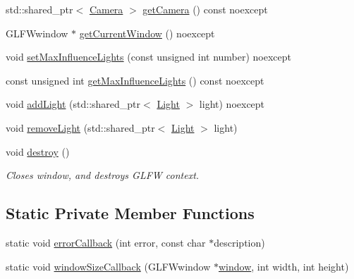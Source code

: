 \begin{DoxyCompactItemize}
\item 
std\+::shared\+\_\+ptr$<$ \hyperlink{class_graphics_1_1_camera}{Camera} $>$ \hyperlink{class_graphics_1_1_graphics_system_a38c09a55355c54a8d72c0107434fb78d}{get\+Camera} () const noexcept
\item 
G\+L\+F\+Wwindow $\ast$ \hyperlink{class_graphics_1_1_graphics_system_a0692ae8d8615f820ed36615e9619fe68}{get\+Current\+Window} () noexcept
\item 
void \hyperlink{class_graphics_1_1_graphics_system_a0ce4ee8411cfd40964b7953937e03818}{set\+Max\+Influence\+Lights} (const unsigned int number) noexcept
\item 
const unsigned int \hyperlink{class_graphics_1_1_graphics_system_a7768af0bfa78b4eafbe6a4126e26e819}{get\+Max\+Influence\+Lights} () const noexcept
\item 
void \hyperlink{class_graphics_1_1_graphics_system_ab9f06299b075c0f4ced364160a1e229d}{add\+Light} (std\+::shared\+\_\+ptr$<$ \hyperlink{class_graphics_1_1_light}{Light} $>$ light) noexcept
\item 
void \hyperlink{class_graphics_1_1_graphics_system_a03769b3511fc0ada29bd47cbe08c8eb8}{remove\+Light} (std\+::shared\+\_\+ptr$<$ \hyperlink{class_graphics_1_1_light}{Light} $>$ light)
\item 
void \hyperlink{class_graphics_1_1_graphics_system_a629d2fe80f761f4f4004ba74ad458e3f}{destroy} ()
\begin{DoxyCompactList}\small\item\em Closes window, and destroys G\+L\+F\+W context. \end{DoxyCompactList}\end{DoxyCompactItemize}
\subsection*{Static Private Member Functions}
\begin{DoxyCompactItemize}
\item 
static void \hyperlink{class_graphics_1_1_graphics_system_a0e3ea1d3785e868d7a1318b4c9c15878}{error\+Callback} (int error, const char $\ast$description)
\item 
static void \hyperlink{class_graphics_1_1_graphics_system_a4e895acf6e87b74e835cdbfaf3daa434}{window\+Size\+Callback} (G\+L\+F\+Wwindow $\ast$\hyperlink{class_graphics_1_1_graphics_system_a4430d61bb3fd528b617e8fea26744a8c}{window}, int width, int height)
\end{DoxyCompactItemize}
